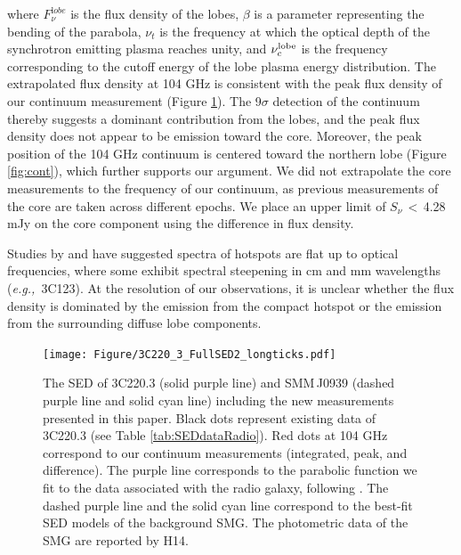 \documentclass[twocolumn,apj,numberedappendix]{emulateapj}
\newcommand{\eg}{{\sl e.g.,~}}
\begin{document}
where $F_{\nu}^{\mathrm lobe}$ is the flux density of the lobes, $\beta$ is a parameter representing the bending 
of the parabola, $\nu_t$ is the frequency at which the optical depth of the synchrotron emitting plasma reaches 
unity, and $\nu_c^{\rm lobe}$ is the frequency corresponding to the cutoff energy of the lobe plasma energy 
distribution. 
The extrapolated flux density at 104\,\,GHz is consistent with the peak flux density of our continuum 
measurement (Figure \ref{fig:SED}). The 9$\sigma$ detection of the continuum thereby suggests
a dominant contribution from the lobes, and the peak flux density does not appear to be emission toward 
the core. Moreover, the peak position of the 104\,\,GHz continuum is
centered toward the northern lobe (Figure \ref{fig:cont}), which further supports our argument. We did not 
extrapolate the core measurements to the frequency of our continuum, as previous measurements of the core are 
taken 
across different epochs. 
We place an upper limit of $S_\nu$\,$<$\,4.28 mJy on the core component using the difference in flux density.
\par
Studies by \citet{Meisenheimer89a} and \citet{Hardcastle08a} have suggested spectra of hotspots are flat up to optical frequencies, where some exhibit spectral steepening in cm and mm wavelengths (\eg 3C123). At the resolution of our observations, it is unclear whether the flux density is dominated by the emission from the compact hotspot or the emission from the surrounding diffuse lobe components.

\begin{figure}[!tbph]
\centering
\texttt{[image: Figure/3C220\_3\_FullSED2\_longticks.pdf]}
\caption{The SED of 3C220.3 (solid purple line) and SMM\,J0939 (dashed purple line and solid cyan line) including the new measurements presented in this paper. 
Black dots represent existing data of 3C220.3 (see Table \ref{tab:SEDdataRadio}). Red dots at 104 GHz correspond to 
our continuum measurements (integrated, peak, and difference). The purple line corresponds to the parabolic function we 
fit to the data associated with the radio galaxy, following \citet{Cleary07a}. The dashed purple line and 
the solid cyan line correspond to the best-fit SED models of the background SMG. The photometric data of the SMG are reported by H14. \label{fig:SED}}
\end{figure}
\end{document}

